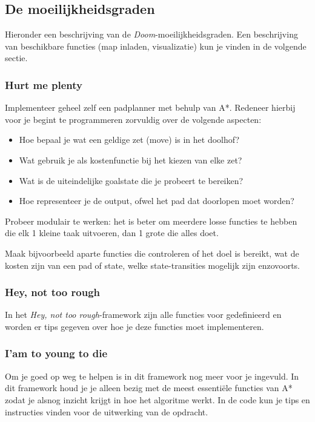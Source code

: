 \documentclass[a4paper]{article}
\begin{document}
\subsection{De moeilijkheidsgraden}
Hieronder een beschrijving van de \textit{Doom}-moeilijkheidsgraden. Een beschrijving van beschikbare functies (map inladen, visualizatie) kun je vinden in de volgende sectie.

\subsubsection{Hurt me plenty}
Implementeer geheel zelf een padplanner met behulp van A*. Redeneer hierbij voor je begint te programmeren zorvuldig over de volgende aspecten:
\begin{itemize}
\item Hoe bepaal je wat een geldige zet (move) is in het doolhof?
\item Wat gebruik je als kostenfunctie bij het kiezen van elke zet?
\item Wat is de uiteindelijke goalstate die je probeert te bereiken?
\item Hoe representeer je de output, ofwel het pad dat doorlopen moet worden? 
\end{itemize}

Probeer modulair te werken: het is beter om meerdere losse functies te hebben die elk 1 kleine taak uitvoeren, dan 1 grote die alles doet.

Maak bijvoorbeeld aparte functies die controleren of het doel is bereikt, wat de kosten zijn van een pad of state, welke state-transities mogelijk zijn enzovoorts. 

\subsubsection{Hey, not too rough}
In het \textit{Hey, not too rough}-framework zijn alle functies voor gedefinieerd en worden er tips gegeven over hoe je deze functies moet implementeren.

\subsubsection{I'am to young to die}
Om je goed op weg te helpen is in dit framework nog meer voor je ingevuld. In dit framework houd je je alleen bezig met de meest essenti\"ele functies van A* zodat je alsnog inzicht krijgt in hoe het algoritme werkt. In de code kun je tips en instructies vinden voor de uitwerking van de opdracht.
\end{document}
